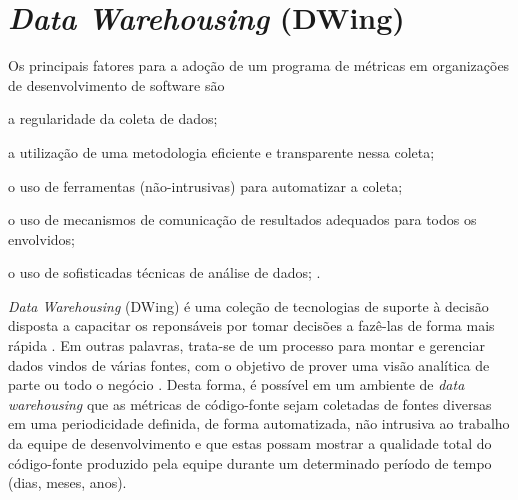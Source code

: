 \chapter{\textit{Data Warehousing} (DWing)} 

Os principais fatores para a adoção de um programa de métricas em 
organizações de desenvolvimento de software são\begin{inparaenum}[i)]
\item a regularidade da coleta de dados;
\item a utilização de uma metodologia eficiente e transparente nessa coleta; 
\item o uso de ferramentas (não-intrusivas) para automatizar a coleta; 
\item o uso de mecanismos de comunicação de resultados adequados para todos os envolvidos; 
\item o uso de sofisticadas técnicas de análise de dados;
.
\end{inparaenum} 


\textit{Data Warehousing} (DWing) é uma coleção de tecnologias de suporte à decisão disposta a capacitar os reponsáveis por tomar decisões a fazê-las de forma mais rápida . Em outras palavras, trata-se de um processo para montar e gerenciar dados vindos de várias fontes, com o objetivo de prover uma visão analítica de parte ou todo o negócio \cite{gardner1998}. Desta forma, é possível em um ambiente de \textit{data warehousing} que as métricas de código-fonte sejam coletadas de fontes diversas em uma periodicidade definida, de forma automatizada, não intrusiva ao trabalho da equipe de desenvolvimento e que estas possam mostrar a qualidade total do código-fonte produzido pela equipe durante um determinado período de tempo (dias, meses, anos). 


